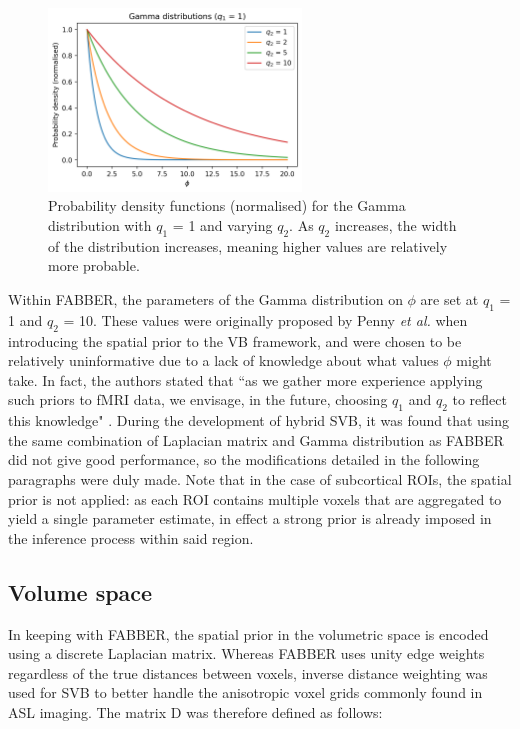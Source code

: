 \documentclass[12pt]{report}
\newcommand{\mat}[1]{\mathrm{#1}}
\begin{document}
\begin{figure}
\centering
\includegraphics[width=0.6\textwidth]{gamma_q2_plot.png}
\caption{Probability density functions (normalised) for the Gamma distribution with $q_1$ = 1 and varying $q_2$. As $q_2$ increases, the width of the distribution increases, meaning higher values are relatively more probable.}
\label{gamma_q2_plot} 
\end{figure}

Within FABBER, the parameters of the Gamma distribution on $\phi$ are set at $q_1$ = 1 and $q_2$ = 10. These values were originally proposed by Penny \textit{et al.} when introducing the spatial prior to the VB framework, and were chosen to be relatively uninformative due to a lack of knowledge about what values $\phi$ might take. In fact, the authors stated that ``as we gather more experience applying such priors to fMRI data, we envisage, in the future, choosing $q_1$ and $q_2$ to reflect this knowledge" \cite{Penny2005}. During the development of hybrid SVB, it was found that using the same combination of Laplacian matrix and Gamma distribution as FABBER did not give good performance, so the modifications detailed in the following paragraphs were duly made. Note that in the case of subcortical ROIs, the spatial prior is not applied: as each ROI contains multiple voxels that are aggregated to yield a single parameter estimate, in effect a strong prior is already imposed in the inference process within said region.  

\subsection{Volume space}

In keeping with FABBER, the spatial prior in the volumetric space is encoded using a discrete Laplacian matrix. Whereas FABBER uses unity edge weights regardless of the true distances between voxels, inverse distance weighting was used for SVB to better handle the anisotropic voxel grids commonly found in ASL imaging. The matrix $\mat{D}$ was therefore defined as follows: 
\end{document}

